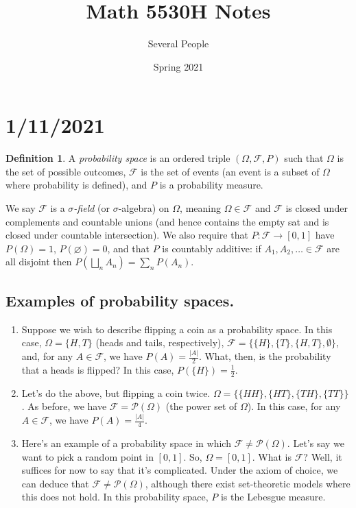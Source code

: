 \documentclass{article}
\title{\textbf{Math 5530H Notes}}
\author{Several People}
\date{Spring 2021}
\newcommand{\p}[1]{\left(#1\right)} %
\newcommand{\pow}[1]{\mathcal{P}(#1)} %
\theoremstyle{definition}
\newtheorem*{definition}{Definition}
\begin{document}
\maketitle

\section*{1/11/2021}

\begin{definition}
A \emph{probability space} is an ordered triple $\p{\Omega, \mathscr{F}, P}$ such that $\Omega$ is the set of possible outcomes, $\mathscr{F}$ is the set of events (an event is a subset of $\Omega$ where probability is defined), and $P$ is a probability measure.

We say $\mathscr{F}$ is a \emph{$\sigma$-field} (or $\sigma$-algebra) on $\Omega$, meaning $\Omega \in \mathscr{F}$ and $\mathscr{F}$ is closed under complements and countable unions (and hence contains the empty sat and is closed under countable intersection). We also require that $P: \mathscr{F} \longrightarrow [0,1]$ have $P(\Omega) = 1$, $P(\varnothing) = 0$, and that $P$ is countably additive:
if $A_1, A_2, \ldots \in \mathscr{F}$ are all disjoint then $P\left(\bigsqcup_{n} A_n \right) = \sum_n P(A_n)$.
\end{definition}

\subsection*{Examples of probability spaces.}


\begin{enumerate}[label=(\alph*)]
    \item Suppose we wish to describe flipping a coin as a probability space. In this case, $\Omega = \{H, T\}$ (heads and tails, respectively), $\mathscr{F} = \{\{H\},\{T\},\{H, T\}, \emptyset\}$, and, for any $A \in \mathscr{F}$, we have $P(A) = \frac{|A|}{2}$. What, then, is the probability that a heads is flipped? In this case, $P(\{H\}) = \frac{1}{2}$.
    \item Let's do the above, but flipping a coin twice. $\Omega = \{\{HH\},\{HT\},\{TH\},\{TT\}\}$. As before, we have $\mathscr{F} = \pow{\Omega}$ (the power set of $\Omega$). In this case, for any $A \in \mathscr{F}$, we have $P(A) = \frac{|A|}{4}$.
    \item Here's an example of a probability space in which $\mathscr{F}\neq\pow{\Omega}$. Let's say we want to pick a random point in $[0,1]$. So, $\Omega = [0,1]$. What is $\mathscr{F}$? Well, it suffices for now to say that it's complicated. Under the axiom of choice, we can deduce that $\mathscr{F}\neq\pow{\Omega}$, although there exist set-theoretic models where this does not hold. In this probability space, $P$ is the Lebesgue measure. 
\end{enumerate}
\end{document}
